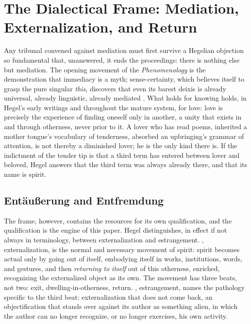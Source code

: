 \section{The Dialectical Frame: Mediation, Externalization, and Return}
\label{p02:sec:hegel}

Any tribunal convened against mediation must first survive a Hegelian objection so fundamental that, unanswered, it ends the proceedings: there is nothing else but mediation. The opening movement of the \emph{Phenomenology} is the demonstration that immediacy is a myth; sense-certainty, which believes itself to grasp the pure singular \emph{this}, discovers that even its barest deixis is already universal, already linguistic, already mediated \parencite{hegel1807phenomenology}. What holds for knowing holds, in Hegel's early writings and throughout the mature system, for love: love is precisely the experience of finding oneself only in another, a unity that exists in and through otherness, never prior to it. A lover who has read poems, inherited a mother tongue's vocabulary of tenderness, absorbed an upbringing's grammar of attention, is not thereby a diminished lover; he is the only kind there is. If the indictment of the tender tip is that a third term has entered between lover and beloved, Hegel answers that the third term was always already there, and that its name is spirit.

\subsection{Ent\"au{\ss}erung and Entfremdung}
\label{p02:sec:hegel-distinction}

The frame, however, contains the resources for its own qualification, and the qualification is the engine of this paper. Hegel distinguishes, in effect if not always in terminology, between externalization and estrangement. , externalization, is the normal and necessary movement of spirit: spirit becomes actual only by going out of itself, embodying itself in works, institutions, words, and gestures, and then \emph{returning to itself} out of this otherness, enriched, recognizing the externalized object as its own. The movement has three beats, not two: exit, dwelling-in-otherness, return. , estrangement, names the pathology specific to the third beat: externalization that does not come back, an objectification that stands over against its author as something alien, in which the author can no longer recognize, or no longer exercises, his own activity.

